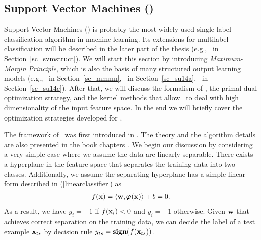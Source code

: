 {\iffalse
The key is to introduce a set of tighter upper bounds on (\ref{lr_posteriori_log}) that are parameterized by $\valpha$.
The bounds should have a simple form such that the maximizing (\ref{lr_posteriori_log}) over $\vw$ can be solved analytically with $\alpha$.
The solution to the original problem is transferred as finding the tighter upper bounds for  $\vw$, which is to minimize with respect to $\alpha$.

Later on, optimization algorithms that are based on dual form have been developed, for example iterative optimization method \citep{Keerthi05a} and the dual coordinate descent method \citep{Yu11dual}.
\fi


%
% 
\subsection{Support Vector Machines (\svm)}	\label{sc_svm}

Support Vector Machines (\svm) is probably the most widely used single-label classification algorithm in machine learning.
Its extensions for multilabel classification will be described in the later part of the thesis (e.g., \svmstruct\ in Section~\ref{sc_svmstruct}).
We will start this section by introducing \textit{Maximum-Margin Principle}, which is also the basis of many structured output learning models (e.g., \mmmn\ in Section~\ref{sc_mmmn}, \spin\ in Section~\ref{sc_su14a}, \rta\ in Section~\ref{sc_su14c}).
After that, we will discuss the formalism of \svm, the primal-dual optimization strategy, and the kernel methods that allow \svm\ to deal with high dimensionality of the input feature space.
In the end we will briefly cover the optimization strategies developed for \svm.

The framework of \svm\ was first introduced in \citep{Cortes95support}.
The theory and the algorithm details are also presented in the book chapters \citep{Scholkopf02learning,taylor04,Bishop07}.
We begin our discussion by considering a very simple case where we assume the data are linearly separable.
There exists a hyperplane in the feature space that separates the training data into two classes.
Additionally, we assume the {separating hyperplane} has a simple linear form described in (\ref{linearclassifier}) as
\begin{align*}
	f(\mathbf {x})=\langle \mathbf {w}, \pmb \varphi(\mathbf {x}) \rangle + b = 0.
\end{align*}
As a result, we have $y_i=-1$ if $f(\mathbf {x}_i)<0$ and $y_i=+1$ otherwise.
Given $\vw$ that achieves correct separation on the training data, we can decide the label of a test example $\mathbf {x}_{ts}$ by decision rule $y_{ts}=\textbf{sign}(f(\mathbf {x}_{ts}))$.

}
